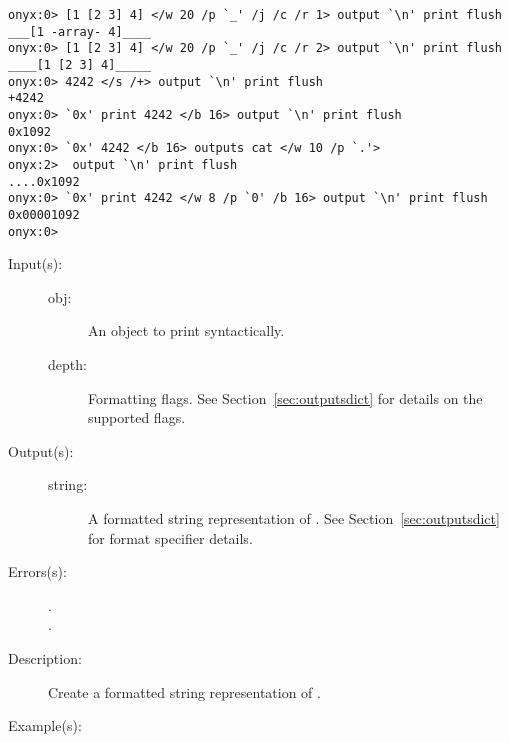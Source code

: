 \begin{description}
\begin{description}
\begin{verbatim}
onyx:0> [1 [2 3] 4] </w 20 /p `_' /j /c /r 1> output `\n' print flush
___[1 -array- 4]____
onyx:0> [1 [2 3] 4] </w 20 /p `_' /j /c /r 2> output `\n' print flush
____[1 [2 3] 4]_____
onyx:0> 4242 </s /+> output `\n' print flush
+4242
onyx:0> `0x' print 4242 </b 16> output `\n' print flush
0x1092
onyx:0> `0x' 4242 </b 16> outputs cat </w 10 /p `.'>
onyx:2>  output `\n' print flush
....0x1092
onyx:0> `0x' print 4242 </w 8 /p `0' /b 16> output `\n' print flush
0x00001092
onyx:0>
		\end{verbatim}
	\end{description}
\label{systemdict:outputs}
\item[{\onyxop{obj flags}{outputs}{string}}: ]
	\begin{description}\item[]
	\item[Input(s): ]
		\begin{description}\item[]
		\item[obj: ]
			An object to print syntactically.
		\item[depth: ]
			Formatting flags.  See Section~\ref{sec:outputsdict} for
			details on the supported flags.
		\end{description}
	\item[Output(s): ]
		\begin{description}\item[]
		\item[string: ]
			A formatted string representation of .
			See Section~\ref{sec:outputsdict} for format specifier
			details.
		\end{description}
	\item[Errors(s): ]
		\begin{description}\item[]
		\item[.]
		\item[.]
		\end{description}
	\item[Description: ]
		Create a formatted string representation of .
	\item[Example(s): ]\begin{verbatim}


\end{verbatim}
\end{description}
\end{description}
